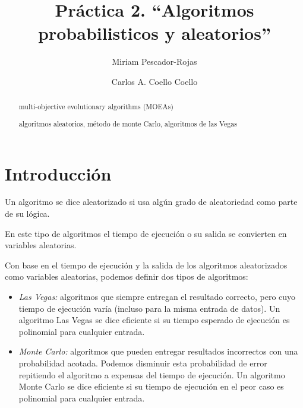 \documentclass[runningheads,a4paper]{llncs}
\newcommand{\keywords}[1]{\par\addvspace\baselineskip
\noindent\keywordname\enspace\ignorespaces#1}
\begin{document}
\mainmatter

\title{Pr\'actica 2. ``Algoritmos probabilisticos y aleatorios''}



\author{
   Miriam Pescador-Rojas \and
   Carlos A. Coello Coello
%   
}




\maketitle

\begin{abstract}
multi-objective evolutionary algorithms (MOEAs) 

\keywords{algoritmos aleatorios, m\'etodo de monte Carlo, algoritmos de las Vegas}
          
\end{abstract}


\section{Introducci\'on}
Un algoritmo se dice aleatorizado si usa alg\'un grado de aleatoriedad como parte de su l\'ogica.

En este tipo de algoritmos el tiempo de ejecuci\'on o su salida se convierten en variables aleatorias.

Con base en el tiempo de ejecuci\'on y la salida de los algoritmos aleatorizados 
como variables aleatorias, podemos  definir dos tipos de algoritmos:
\begin{itemize}
\item 	\textit{Las Vegas:} algoritmos que siempre entregan el resultado correcto, pero cuyo tiempo de ejecuci\'on var\'ia (incluso para la misma entrada de datos).
Un algoritmo Las Vegas se dice eficiente si su tiempo esperado de ejecuci\'on es polinomial para cualquier entrada.
\item 	\textit{Monte Carlo:} algoritmos que pueden entregar resultados incorrectos con una probabilidad acotada.
Podemos disminuir esta probabilidad de error repitiendo el algoritmo a expensas del tiempo de ejecuci\'on.
Un algoritmo Monte Carlo se dice eficiente si su tiempo de ejecuci\'on en el peor caso es polinomial para cualquier entrada.
\end{itemize}
\end{document}
